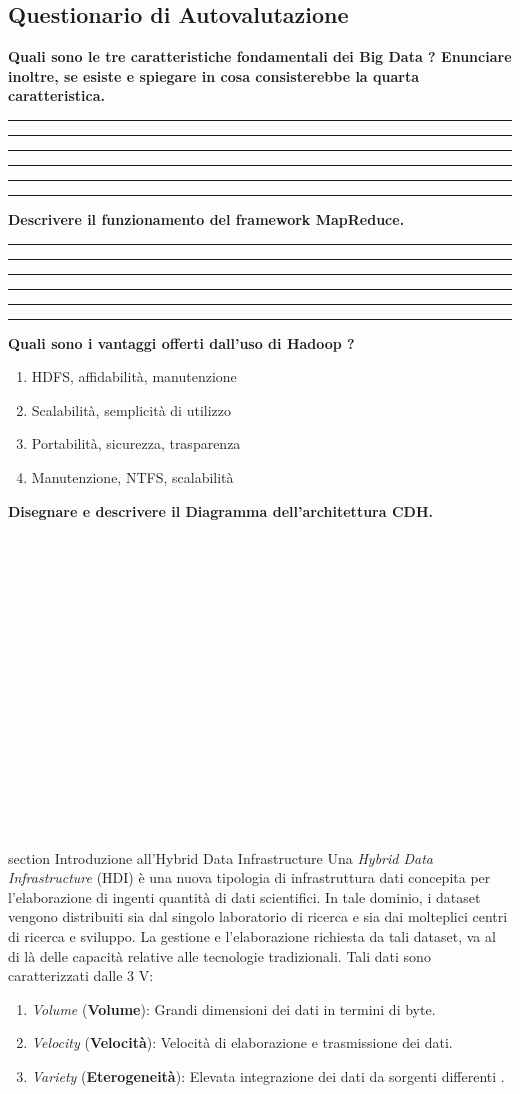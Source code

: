 \documentclass[11pt]{article}
\newcommand{\voceU}[1]{%
	\item #1\dotfill\Square%
}
\begin{document}
\subsection{Questionario di Autovalutazione}
\textbf{Quali sono le tre caratteristiche fondamentali  dei Big Data ? Enunciare inoltre, se esiste e spiegare in cosa consisterebbe la quarta caratteristica.}\\[5ex]
\rule[5mm]{\textwidth}{0.1mm} 
\rule[5mm]{\textwidth}{0.1mm} 
\rule[5mm]{\textwidth}{0.1mm} 
\rule[5mm]{\textwidth}{0.1mm} 
\rule[5mm]{\textwidth}{0.1mm} 
\rule[5mm]{\textwidth}{0.1mm} 
\textbf{Descrivere il funzionamento del framework MapReduce.}\\[5ex]
\rule[5mm]{\textwidth}{0.1mm} 
\rule[5mm]{\textwidth}{0.1mm} 
\rule[5mm]{\textwidth}{0.1mm} 
\rule[5mm]{\textwidth}{0.1mm} 
\rule[5mm]{\textwidth}{0.1mm} 
\rule[5mm]{\textwidth}{0.1mm} 
\textbf{Quali sono i vantaggi offerti dall'uso di Hadoop ?}
\begin{enumerate}
	\voceU{HDFS, affidabilità, manutenzione}
	\voceU{Scalabilità, semplicità di utilizzo}
	\voceU{Portabilità, sicurezza, trasparenza}
	\voceU{Manutenzione, NTFS, scalabilità}\\
\end{enumerate}
\textbf{Disegnare e descrivere il Diagramma dell'architettura CDH.}\\\\\\\\\\\\\\\\\\\\\\\\\\\\\\\\\\
\newpage


section {Introduzione all'Hybrid Data Infrastructure}
Una \emph{Hybrid Data Infrastructure} (HDI) è una nuova tipologia di infrastruttura dati concepita per l'elaborazione di ingenti quantità di dati scientifici. In tale dominio, i dataset vengono distribuiti sia dal singolo laboratorio di ricerca e sia dai molteplici centri di ricerca e sviluppo. La gestione e l'elaborazione richiesta da tali dataset, va al di là delle capacità relative alle tecnologie tradizionali. Tali dati sono caratterizzati dalle 3 V:
\begin{enumerate}
	\item \emph{Volume} (\textbf{Volume}): Grandi dimensioni dei dati in termini di byte.
	\item \emph{Velocity} (\textbf{Velocità}): Velocità di elaborazione e trasmissione dei dati.
	\item \emph{Variety} (\textbf{Eterogeneità}): Elevata integrazione dei dati da sorgenti differenti \cite{candela2012managing}.
\end{enumerate}
\end{document}
